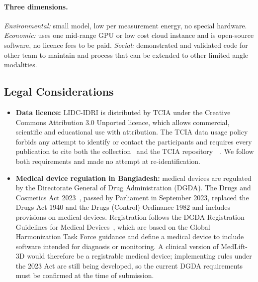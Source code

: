 \paragraph{Three dimensions.} \emph{Environmental:} small model, low per measurement energy, no special hardware. \emph{Economic:} uses one mid-range GPU or low cost cloud instance and is open-source software, no licence fees to be paid. \emph{Social:} demonstrated and validated code for other team to maintain and process that can be extended to other limited angle modalities.

\subsection{Legal Considerations}

\begin{itemize}
  \item \textbf{Data licence:} LIDC-IDRI is distributed by TCIA under the Creative Commons Attribution 3.0 Unported licence, which allows commercial, scientific and educational use with attribution. The TCIA data usage policy forbids any attempt to identify or contact the participants and requires every publication to cite both the collection~\cite{armato2011lidc} and the TCIA repository~\cite{clark2013tcia}~\cite{tcia_policy}. We follow both requirements and made no attempt at re-identification.
  \item \textbf{Medical device regulation in Bangladesh:} medical devices are regulated by the Directorate General of Drug Administration (DGDA). The Drugs and Cosmetics Act 2023~\cite{bddca2023}, passed by Parliament in September 2023, replaced the Drugs Act 1940 and the Drugs (Control) Ordinance 1982 and includes provisions on medical devices. Registration follows the DGDA Registration Guidelines for Medical Devices~\cite{dgda2015}, which are based on the Global Harmonization Task Force guidance and define a medical device to include software intended for diagnosis or monitoring. A clinical version of MedLift-3D would therefore be a registrable medical device; implementing rules under the 2023 Act are still being developed, so the current DGDA requirements must be confirmed at the time of submission.

\end{itemize}
